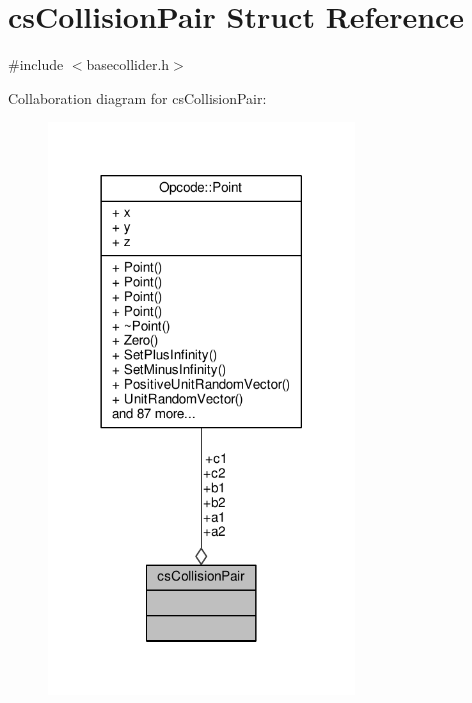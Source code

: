 \hypertarget{structcsCollisionPair}{}\section{cs\+Collision\+Pair Struct Reference}
\label{structcsCollisionPair}


{\ttfamily \#include $<$basecollider.\+h$>$}



Collaboration diagram for cs\+Collision\+Pair\+:
\nopagebreak
\begin{figure}[H]
\begin{center}
\leavevmode
\includegraphics[width=230pt]{d0/ddd/structcsCollisionPair__coll__graph}
\end{center}
\end{figure}
